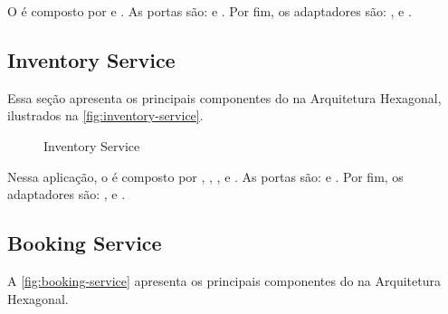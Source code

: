 O  é composto por  e . As portas são:  e . Por fim, os adaptadores são: ,  e .

\subsection{Inventory Service}
Essa seção apresenta os principais componentes do  na Arquitetura Hexagonal, ilustrados na \autoref{fig:inventory-service}.

\begin{figure}[H]
    \centering
    \caption{Inventory Service}
    \label{fig:inventory-service}
\end{figure}

Nessa aplicação, o  é composto por , , ,  e . As portas são:  e . Por fim, os adaptadores são: ,  e .

\subsection{Booking Service}
A \autoref{fig:booking-service} apresenta os principais componentes do  na Arquitetura Hexagonal.

